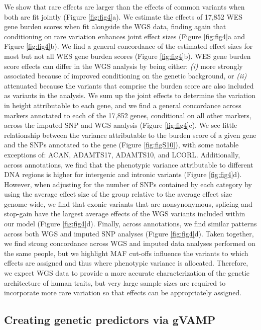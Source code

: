 We show that rare effects are larger than the effects of common variants when both are fit jointly (Figure \ref{fig:fig4}a). We estimate the effects of 17,852 WES gene burden scores when fit alongside the WGS data, finding again that conditioning on rare variation enhances joint effect sizes (Figure \ref{fig:fig4}a and Figure \ref{fig:fig4}b). We find a general concordance of the estimated effect sizes for most but not all WES gene burden scores (Figure \ref{fig:fig4}b). WES gene burden score effects can differ in the WGS analysis by being either: \emph{(i)} more strongly associated because of improved conditioning on the genetic background, or \emph{(ii)} attenuated because the variants that comprise the burden score are also included as variants in the analysis. We sum up the joint effects to determine the variation in height attributable to each gene, and we find a general concordance across markers annotated to each of the 17,852 genes, conditional on all other markers, across the imputed SNP and WGS analysis (Figure \ref{fig:fig4}c). We see little relationship between the variance attributable to the burden score of a given gene and the SNPs annotated to the gene (Figure \ref{fig:figS10}), with some notable exceptions of: ACAN, ADAMTS17, ADAMTS10, and LCORL.
Additionally, across annotations, we find that the phenotypic variance attributable to different DNA regions is higher for intergenic and intronic variants (Figure \ref{fig:fig4}d). However, when adjusting for the number of SNPs contained by each category by using the average effect size of the group relative to the average effect size genome-wide, we find that exonic variants that are nonsynonymous, splicing and stop-gain have the largest average effects of the WGS variants included within our model (Figure \ref{fig:fig4}d). 
Finally, across annotations, we find similar patterns across both WGS and imputed SNP analyses (Figure \ref{fig:fig4}d). Taken together, we find strong concordance across WGS and imputed data analyses performed on the same people, but we highlight MAF cut-offs influence the variants to which effects are assigned and thus where phenotypic variance is allocated. Therefore, we expect WGS data to provide a more accurate characterization of the genetic architecture of human traits, but very large sample sizes are required to incorporate more rare variation so that effects can be appropriately assigned.

\subsection{Creating genetic predictors via gVAMP}

